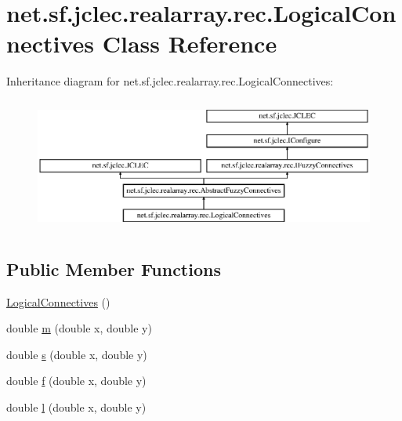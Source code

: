 \hypertarget{classnet_1_1sf_1_1jclec_1_1realarray_1_1rec_1_1_logical_connectives}{\section{net.\-sf.\-jclec.\-realarray.\-rec.\-Logical\-Connectives Class Reference}
\label{classnet_1_1sf_1_1jclec_1_1realarray_1_1rec_1_1_logical_connectives}
}
Inheritance diagram for net.\-sf.\-jclec.\-realarray.\-rec.\-Logical\-Connectives\-:\begin{figure}[H]
\begin{center}
\leavevmode
\includegraphics[height=4.416404cm]{classnet_1_1sf_1_1jclec_1_1realarray_1_1rec_1_1_logical_connectives}
\end{center}
\end{figure}
\subsection*{Public Member Functions}
\begin{DoxyCompactItemize}
\item 
\hyperlink{classnet_1_1sf_1_1jclec_1_1realarray_1_1rec_1_1_logical_connectives_a049f6e1a826887204fea7fd477dd0a57}{Logical\-Connectives} ()
\item 
double \hyperlink{classnet_1_1sf_1_1jclec_1_1realarray_1_1rec_1_1_logical_connectives_afa11b1a01d73e5d36baaddf9d57fe37e}{m} (double x, double y)
\item 
double \hyperlink{classnet_1_1sf_1_1jclec_1_1realarray_1_1rec_1_1_logical_connectives_a3cc3040e64a8f4d351c0b08700ef57a7}{s} (double x, double y)
\item 
double \hyperlink{classnet_1_1sf_1_1jclec_1_1realarray_1_1rec_1_1_logical_connectives_ab784b27dbe39572e09de303adfafde7c}{f} (double x, double y)
\item 
double \hyperlink{classnet_1_1sf_1_1jclec_1_1realarray_1_1rec_1_1_logical_connectives_aa4f94deafe1f0a9386c257abfbe455c2}{l} (double x, double y)
\end{DoxyCompactItemize}


